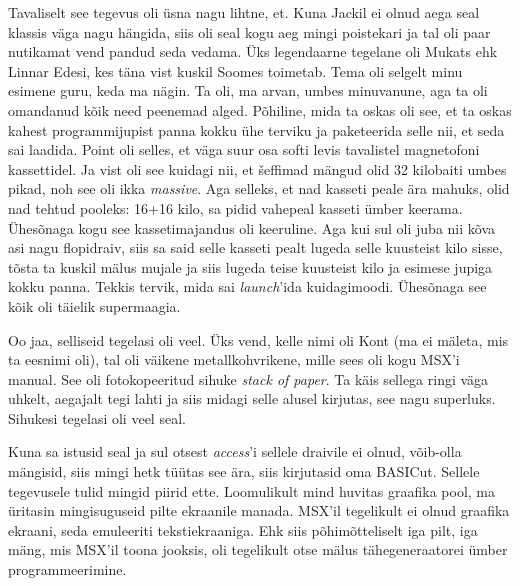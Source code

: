 Tavaliselt see tegevus oli üsna nagu lihtne, et. Kuna Jackil ei olnud aega seal klassis väga nagu hängida, siis oli seal kogu aeg mingi poistekari ja tal oli paar nutikamat vend pandud seda vedama. Üks legendaarne tegelane oli Mukats ehk Linnar Edesi, kes täna vist kuskil Soomes toimetab. Tema oli selgelt minu esimene guru, keda ma nägin. Ta oli, ma arvan, umbes minuvanune, aga ta oli omandanud kõik need peenemad alged. Põhiline, mida ta oskas oli see, et ta oskas kahest programmijupist panna kokku ühe terviku ja  paketeerida selle nii, et seda sai laadida. Point oli selles, et väga suur osa softi levis tavalistel magnetofoni kassettidel. Ja vist oli see kuidagi nii, et šeffimad mängud olid  32 kilobaiti umbes pikad, noh see oli ikka \emph{massive}. Aga selleks, et nad kasseti peale ära mahuks, olid nad tehtud pooleks: 16+16 kilo, sa pidid vahepeal kasseti ümber keerama. Ühesõnaga kogu see kassetimajandus oli keeruline. Aga kui sul oli juba nii kõva asi nagu flopidraiv, siis sa said selle kasseti pealt lugeda selle kuusteist kilo sisse, tõsta ta kuskil mälus mujale ja siis lugeda teise kuusteist kilo ja esimese jupiga kokku panna. Tekkis  tervik, mida sai \emph{launch}'ida kuidagimoodi. Ühesõnaga see kõik oli täielik supermaagia. 


Oo jaa, selliseid tegelasi oli veel. Üks vend, kelle nimi oli Kont (ma ei mäleta, mis ta eesnimi oli), tal oli väikene metallkohvrikene, mille sees oli kogu MSX'i manual. See oli fotokopeeritud sihuke \emph{stack of paper}. Ta käis sellega ringi väga uhkelt, aegajalt tegi lahti ja siis midagi selle alusel kirjutas, see nagu superluks. Sihukesi tegelasi oli veel seal. 

Kuna sa istusid seal ja sul otsest \emph{access}'i sellele draivile ei olnud, võib-olla  mängisid, siis mingi hetk tüütas see ära, siis kirjutasid oma BASICut. Sellele tegevusele tulid mingid piirid ette. Loomulikult mind huvitas graafika pool, ma üritasin mingisuguseid pilte ekraanile manada. MSX'il  tegelikult ei olnud graafika ekraani,  seda emuleeriti tekstiekraaniga. Ehk siis  põhimõtteliselt iga pilt, iga mäng, mis MSX'il toona jooksis, oli tegelikult otse mälus tähegeneraatorei ümber programmeerimine. 

